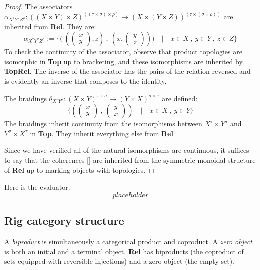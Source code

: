 \begin{fullwidth}
\begin{proposition}
\begin{proof}
The associators $\alpha_{X^{\tau}Y^{\sigma}Z^{\rho}} : ((X \times Y) \times Z)^{((\tau \times \sigma) \times \rho)} \rightarrow (X \times (Y \times Z))^{(\tau \times (\sigma \times \rho))}$ are inherited from \textbf{Rel}. They are:
\[\alpha_{X^{\tau}Y^{\sigma}Z^{\rho}} := \{\big( \ (\begin{pmatrix} x \\ y \end{pmatrix} , z) \ , \ (x, \begin{pmatrix} y \\ z \end{pmatrix}) \big) \quad | \quad x \in X \ , \ y \in Y \ ,\ z \in Z \}\]
To check the continuity of the associator, observe that product topologies are isomorphic in \textbf{Top} up to bracketing, and these isomorphisms are inherited by \textbf{TopRel}. The inverse of the associator has the pairs of the relation reversed and is evidently an inverse that composes to the identity.

The braidings $\theta_{X^{\tau}Y^{\sigma}} : (X \times Y)^{\tau \times \sigma} \rightarrow (Y \times X)^{\sigma \times \tau}$ are defined:
\[\{(\begin{pmatrix} x \\ y \end{pmatrix} \ , \ \begin{pmatrix} y \\ x \end{pmatrix}) \quad | \quad x \in X \ , \ y \in Y  \}\]
The braidings inherit continuity from the isomorphisms between $X^\tau \times Y^\sigma$ and $Y^\sigma \times X^\tau$ in \textbf{Top}. They inherit everything else from \textbf{Rel}

Since we have verified all of the natural isomorphisms are continuous, it suffices to say that the coherences [] are inherited from the symmetric monoidal structure of \textbf{Rel} up to marking objects with topologies.
\end{proof}

Here is the evaluator.
\[placeholder\]
\end{proposition}

\subsection{Rig category structure}

\begin{defn}
A \emph{biproduct} is simultaneously a categorical product and coproduct. A \emph{zero object} is both an initial and a terminal object. \textbf{Rel} has biproducts (the coproduct of sets equipped with reversible injections) and a zero object (the empty set).
\end{defn}


\end{fullwidth}
